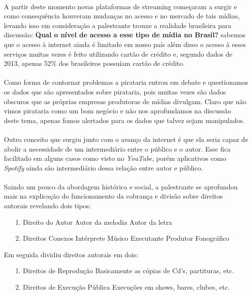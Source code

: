 \documentclass[10pt]{article}
\begin{document}
	\paragraph{}
		A partir deste momento novas plataformas de streaming começaram a surgir
		e como consequência houveram mudanças no acesso e no mercado de tais 
		mídias, levando isso em consideração a palestrante trouxe a realidade
		brasileira para discussão: \textbf{Qual o nível de acesso a esse tipo de mídia
		no Brasil?} sabemos que o acesso à internet ainda é limitado em nosso país
		além disso o acesso à esses serviços muitas vezes é feito utilizando cartão
		de crédito e, segundo dados de 2013, apenas 52\% dos brasileiros possuíam
		cartão de crédito.
	\paragraph{}
			Como forma de contornar problemas a pirataria entrou em debate e
			questionamos os dados que são apresentados sobre pirataria, pois
			muitas vezes são dados obscuros que as próprias empresas produtoras
			de mídias divulgam. Claro que não vimos pirataria como um bom negócio
			e não nos aprofundamos na discussão deste tema, apenas fomos alertados
			para os dados que talvez sejam manipulados.
	\paragraph{}
		Outro conceito que surgiu junto com o avanço da internet é que ela seria
		capaz de abolir a necessidade de um intermediário entre o público e o
		autor. Esse fica facilitado em alguns casos como visto no \textit{YouTube},
		porém aplicativos como \textit{Spotify} ainda são intermediário dessa relação 
		entre autor e público.
	\paragraph{}
		Saindo um pouco da abordagem histórica e social, a palestrante se aprofundou mais na
		explicação	do funcionamento da cobrança e divisão sobre direitos autorais	
		revelando dois tipos:
		\begin{itemize}
			\item[1.]					
				Direito do Autor
					\subitem
						Autor da melodia
					\subitem	
						Autor da letra		
			\item[2.]
				Direitos Conexos
				\subitem
					Intérprete
				\subitem	
					Músico Executante
				\subitem	
					Produtor Fonográfico
		\end{itemize}
		Em seguida dividiu direitos autorais em dois:
		\begin{itemize}
			\item[1.]					
				Direitos de Reprodução
					\subitem
						Basicamente as cópias de Cd's, partituras, etc.		
			\item[2.]
				Direitos de Execução Pública
				\subitem
					Execuções em shows, bares, clubes, etc.
		\end{itemize}	
\end{document}
